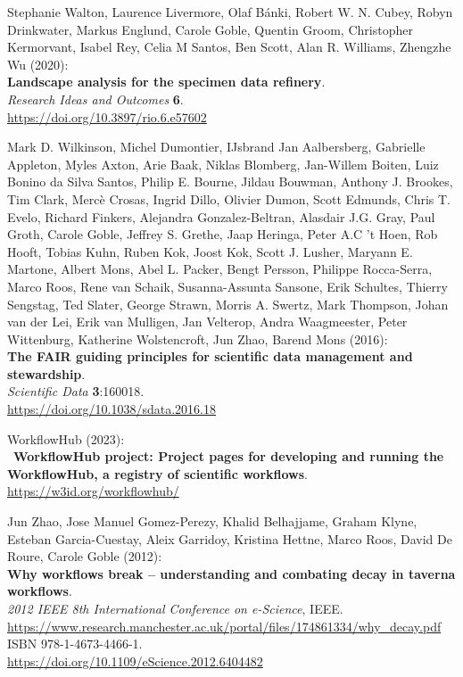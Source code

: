 \begin{thebibliography}{9}
Stephanie Walton, Laurence Livermore, Olaf Bánki, Robert W. N.
Cubey, Robyn Drinkwater, Markus Englund, Carole Goble, Quentin Groom,
Christopher Kermorvant, Isabel Rey, Celia M Santos, Ben Scott, Alan R.
Williams, Zhengzhe Wu (2020):\\
\textbf{Landscape analysis for the specimen data refinery}.\\
\emph{Research Ideas and Outcomes} \textbf{6}.\\
\url{https://doi.org/10.3897/rio.6.e57602}

Mark D. Wilkinson, Michel Dumontier, IJsbrand Jan Aalbersberg,
Gabrielle Appleton, Myles Axton, Arie Baak, Niklas Blomberg, Jan-Willem
Boiten, Luiz Bonino da Silva Santos, Philip E. Bourne, Jildau Bouwman,
Anthony J. Brookes, Tim Clark, Mercè Crosas, Ingrid Dillo, Olivier
Dumon, Scott Edmunds, Chris T. Evelo, Richard Finkers, Alejandra
Gonzalez-Beltran, Alasdair J.G. Gray, Paul Groth, Carole Goble, Jeffrey
S. Grethe, Jaap Heringa, Peter A.C 't Hoen, Rob Hooft, Tobias Kuhn,
Ruben Kok, Joost Kok, Scott J. Lusher, Maryann E. Martone, Albert Mons,
Abel L. Packer, Bengt Persson, Philippe Rocca-Serra, Marco Roos, Rene
van Schaik, Susanna-Assunta Sansone, Erik Schultes, Thierry Sengstag,
Ted Slater, George Strawn, Morris A. Swertz, Mark Thompson, Johan van
der Lei, Erik van Mulligen, Jan Velterop, Andra Waagmeester, Peter
Wittenburg, Katherine Wolstencroft, Jun Zhao, Barend Mons (2016):\\
\textbf{The FAIR guiding principles for scientific data management and
stewardship}.\\
\emph{Scientific Data} \textbf{3}:160018.\\
\url{https://doi.org/10.1038/sdata.2016.18}

\bibitem[WorkflowHub 2023]
WorkflowHub (2023):\\
~\textbf{WorkflowHub project: Project pages for developing and
running the WorkflowHub, a registry of scientific workflows}.\\
\url{https://w3id.org/workflowhub/}

Jun Zhao, Jose Manuel Gomez-Perezy, Khalid Belhajjame, Graham
Klyne, Esteban Garcia-Cuestay, Aleix Garridoy, Kristina Hettne, Marco
Roos, David De Roure, Carole Goble (2012):\\
\textbf{Why workflows break -- understanding and combating decay in
taverna workflows}.\\
\emph{2012 IEEE 8th International Conference on e-Science}, IEEE.
\url{https://www.research.manchester.ac.uk/portal/files/174861334/why_decay.pdf}
ISBN 978-1-4673-4466-1.\\
\url{https://doi.org/10.1109/eScience.2012.6404482}


\end{thebibliography}
